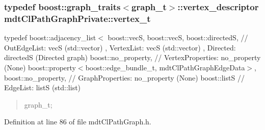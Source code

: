 \hypertarget{namespacemdt_cl_path_graph_private_a0aaa28f25df9a7fcd4602cc15b3b3795}{
\subsubsection[{vertex\-\_\-t}]{\setlength{\rightskip}{0pt plus 5cm}typedef boost\-::graph\-\_\-traits$<${\bf graph\-\_\-t}$>$\-::vertex\-\_\-descriptor {\bf mdt\-Cl\-Path\-Graph\-Private\-::vertex\-\_\-t}}}\label{namespacemdt_cl_path_graph_private_a0aaa28f25df9a7fcd4602cc15b3b3795}
typedef boost\-::adjacency\-\_\-list$<$ boost\-::vec\-S, boost\-::vec\-S, boost\-::directed\-S, // Out\-Edge\-List\-: vec\-S (std\-::vector) , Vertex\-List\-: vec\-S (std\-::vector) , Directed\-: directed\-S (Directed graph) boost\-::no\-\_\-property, // Vertex\-Properties\-: no\-\_\-property (None) boost\-::property$<$boost\-::edge\-\_\-bundle\-\_\-t, mdt\-Cl\-Path\-Graph\-Edge\-Data$>$, boost\-::no\-\_\-property, // Graph\-Properties\-: no\-\_\-property (None) boost\-::list\-S // Edge\-List\-: list\-S (std\-::list) \begin{quotation}
graph\-\_\-t; \end{quotation}


Definition at line 86 of file mdt\-Cl\-Path\-Graph.\-h.

